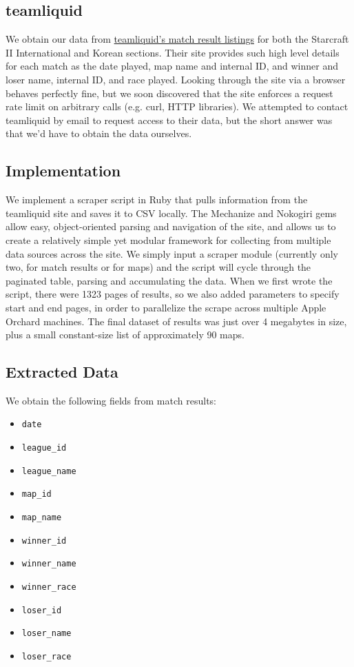 \subsection{teamliquid}
We obtain our data from \href{http://www.teamliquid.net/tlpd/sc2-international/games}{teamliquid's match result listings} for both the Starcraft II International and Korean sections. Their site provides such high level details for each match as the date played, map name and internal ID, and winner and loser name, internal ID, and race played. Looking through the site via a browser behaves perfectly fine, but we soon discovered that the site enforces a request rate limit on arbitrary calls (e.g. curl, HTTP libraries). We attempted to contact teamliquid by email to request access to their data, but the short answer was that we'd have to obtain the data ourselves.

\subsection{Implementation}
We implement a scraper script in Ruby that pulls information from the teamliquid site and saves it to CSV locally. The Mechanize and Nokogiri gems allow easy, object-oriented parsing and navigation of the site, and allows us to create a relatively simple yet modular framework for collecting from multiple data sources across the site. We simply input a scraper module (currently only two, for match results or for maps) and the script will cycle through the paginated table, parsing and accumulating the data. When we first wrote the script, there were 1323 pages of results, so we also added parameters to specify start and end pages, in order to parallelize the scrape across multiple Apple Orchard machines. The final dataset of results was just over 4 megabytes in size, plus a small constant-size list of approximately 90 maps.

\subsection{Extracted Data}
We obtain the following fields from match results:
\begin{multicols}{2}
\begin{itemize}
  \item \verb$date$
  \item \verb$league_id$
  \item \verb$league_name$
  \item \verb$map_id$
  \item \verb$map_name$
  \item \verb$winner_id$
  \item \verb$winner_name$
  \item \verb$winner_race$
  \item \verb$loser_id$
  \item \verb$loser_name$
  \item \verb$loser_race$
\end{itemize}
\end{multicols}

